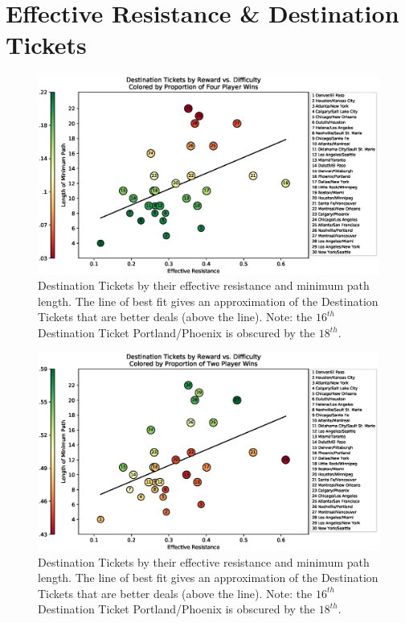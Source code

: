 \section{Effective Resistance \& Destination Tickets}

\begin{figure}[!ht]
\centering
\includegraphics[scale=.8]{figures/resistance_four}
\caption{Destination Tickets by their effective
resistance and minimum path length.
The line of best fit gives an approximation of the
Destination Tickets that are better deals (above the line).
Note: the $16^{th}$ Destination Ticket Portland/Phoenix is obscured
by the $18^{th}$.}
\label{fig:resistance}
\end{figure}

\begin{figure}[!ht]
\centering
\includegraphics[scale=.8]{figures/resistance_two}
\caption{Destination Tickets by their effective
resistance and minimum path length.
The line of best fit gives an approximation of the
Destination Tickets that are better deals (above the line).
Note: the $16^{th}$ Destination Ticket Portland/Phoenix is obscured
by the $18^{th}$.}
\label{fig:resistance}
\end{figure}


